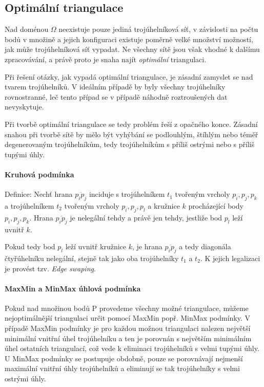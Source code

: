 \documentclass[12pt,a4paper]{article}
\begin{document}
\newpage
\subsection{Optimální triangulace}

Nad doménou $\Omega$ neexistuje pouze jediná trojúhelníková síť, v závislosti na počtu bodů v množině a jejich konfiguraci existuje poměrně velké množství možností, jak může trojúhelníková síť vypadat. Ne všechny sítě jsou však vhodné k dalšímu zpracovávání, a právě proto je snaha najít \textit{optimální} triangulaci.

Při řešení otázky, jak vypadá optimální triangulace, je zásadní zamyslet se nad tvarem trojúhelníků. V ideálním případě by byly všechny trojúhelníky rovnostranné, leč tento případ se v případě náhodně roztroušených dat nevyskytuje.

Při tvorbě optimální triangulace se tedy problém řeší z opačného konce. Zásadní snahou při tvorbě sítě by mělo být vyhýbání se podlouhlým, štíhlým nebo téměř degenerovaným trojúhelníkům, tedy trojúhelníkům s příliš ostrými nebo s příliš tupými úhly. 

\paragraph{Kruhová podmínka}
Definice:
Nechť hrana $\overline{p_ip_j}$ inciduje s trojúhelníkem $t_1$ tvořeným vrcholy $p_i,p_j,p_k$ a trojúhelníkem $t_2$ tvořeným vrcholy $p_i,p_j,p_l$ a kružnice $k$ procházející body $p_i,p_j,p_k$. Hrana $\overline{p_ip_j}$ je nelegální tehdy a právě jen tehdy, jestliže bod $p_l$ leží uvnitř $k$.

Pokud tedy bod $p_l$ leží uvnitř kružnice $k$, je hrana $\overline{p_ip_j}$ a tedy diagonála čtyřúhelníku nelegální, stejně tak jako oba trojúhelníky $t_1$ a $t_2$. K jejich legalizaci je provést tzv. \textit{Edge swaping}.

\paragraph{MaxMin a MinMax úhlová podmínka}

Pokud nad množinou bodů P provedeme všechny možné triangulace, můžeme nejoptimálnější triangulaci určit pomocí MaxMin popř. MinMax podmínky. V případě MaxMin podmínky je pro každou možnou triangulaci nalezen největší minimální vnitřní úhel trojúhelníku a ten je porovnán s největším minimálním úhel ostatních triangulací, což vede k eliminaci trojúhelníků s velmi tupými úhly. U MinMax podmínky se postupuje obdobně, pouze se porovnávají nejmenší maximální vnitřní úhly trojúhelníků a eliminují se tak trojúhelníky s velmi ostrými úhly.
\end{document}
